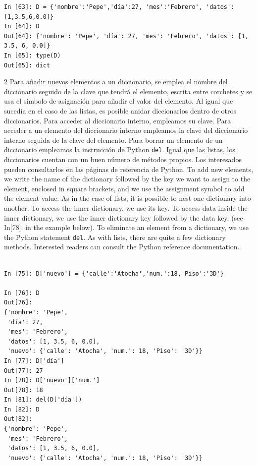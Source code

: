 \begin{verbatim}
In [63]: D = {'nombre':'Pepe','día':27, 'mes':'Febrero', 'datos':[1,3.5,6,0.0]}
In [64]: D
Out[64]: {'nombre': 'Pepe', 'día': 27, 'mes': 'Febrero', 'datos': [1, 3.5, 6, 0.0]}
In [65]: type(D)
Out[65]: dict
\end{verbatim}        


\begin{paracol}{2}
Para añadir nuevos elementos a un diccionario, se emplea el nombre del diccionario seguido de la clave que tendrá el elemento, escrita entre corchetes y se usa el símbolo de asignación para añadir el valor del elemento. Al igual que sucedía en el caso de las listas, es posible anidar diccionarios dentro de otros diccionarios. Para acceder al diccionario interno, empleamos su clave. Para acceder a un elemento del diccionario interno empleamos la clave del diccionario interno seguida de la clave del elemento. Para borrar un elemento de un diccionario empleamos la instrucción de Python \texttt{del}. Igual que las listas, los diccionarios cuentan con un buen número de métodos propios. Los interesados pueden consultarlos en las páginas de referencia de Python.
\switchcolumn
To add new elements, we write the name of the dictionary followed by the key we want to assign to the element, enclosed in square brackets, and we use the assignment symbol to add the element value. As in the case of lists, it is possible to nest one dictionary into another. To access the inner dictionary, we use its key. To access data inside the inner dictionary, we use the inner dictionary key followed by the data key. (see In[78]: in the example below). To eliminate an element from a dictionary, we use the Python statement \texttt{del}. As with lists, there are quite a few dictionary methods. Interested readers can consult the Python reference documentation.
\end{paracol}

\begin{verbatim}

In [75]: D['nuevo'] = {'calle':'Atocha','num.':18,'Piso':'3D'}

In [76]: D
Out[76]: 
{'nombre': 'Pepe',
 'día': 27,
 'mes': 'Febrero',
 'datos': [1, 3.5, 6, 0.0],
 'nuevo': {'calle': 'Atocha', 'num.': 18, 'Piso': '3D'}}
In [77]: D['día']
Out[77]: 27
In [78]: D['nuevo']['num.']
Out[78]: 18
In [81]: del(D['día'])
In [82]: D
Out[82]: 
{'nombre': 'Pepe',
 'mes': 'Febrero',
 'datos': [1, 3.5, 6, 0.0],
 'nuevo': {'calle': 'Atocha', 'num.': 18, 'Piso': '3D'}}
\end{verbatim}


